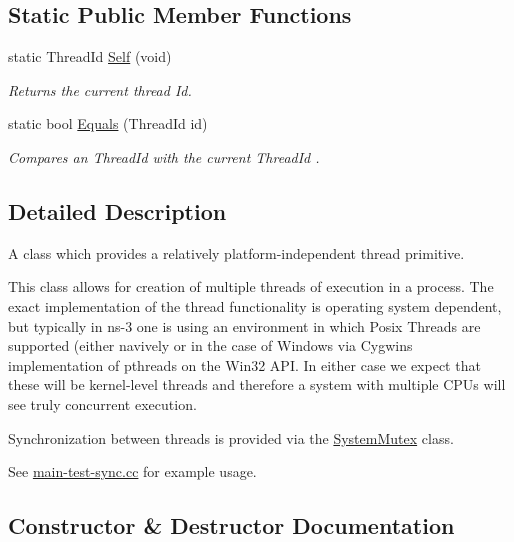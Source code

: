 \subsection*{Static Public Member Functions}
\begin{DoxyCompactItemize}
\item 
static Thread\+Id \hyperlink{classns3_1_1SystemThread_a76dffd0c4383357194c9604f073b0d79}{Self} (void)
\begin{DoxyCompactList}\small\item\em Returns the current thread Id. \end{DoxyCompactList}\item 
static bool \hyperlink{classns3_1_1SystemThread_af6bfffe1a51a4df5f9aa1a468df8bd59}{Equals} (Thread\+Id id)
\begin{DoxyCompactList}\small\item\em Compares an Thread\+Id with the current Thread\+Id . \end{DoxyCompactList}\end{DoxyCompactItemize}


\subsection{Detailed Description}
A class which provides a relatively platform-\/independent thread primitive. 

This class allows for creation of multiple threads of execution in a process. The exact implementation of the thread functionality is operating system dependent, but typically in ns-\/3 one is using an environment in which Posix Threads are supported (either navively or in the case of Windows via Cygwin\textquotesingle{}s implementation of pthreads on the Win32 A\+PI. In either case we expect that these will be kernel-\/level threads and therefore a system with multiple C\+P\+Us will see truly concurrent execution.

Synchronization between threads is provided via the \hyperlink{classns3_1_1SystemMutex}{System\+Mutex} class.

See \hyperlink{main-test-sync_8cc}{main-\/test-\/sync.\+cc} for example usage. 

\subsection{Constructor \& Destructor Documentation}
